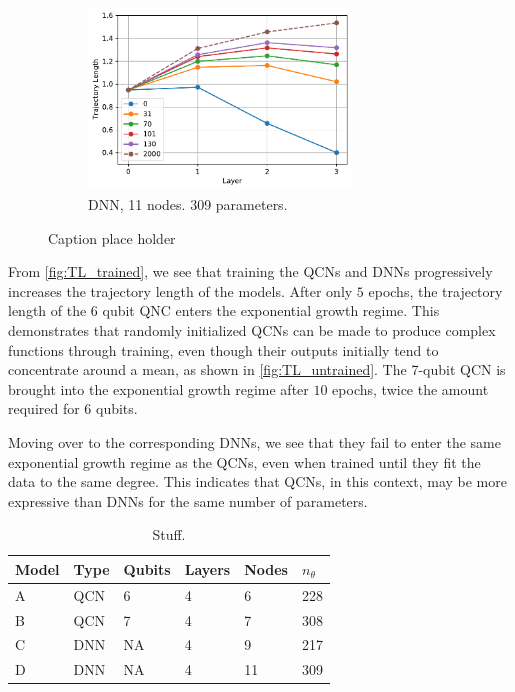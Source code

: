 \begin{figure}[H]
\begin{subfigure}[t]{0.5\textwidth}
    \end{subfigure}%
    \hfill 
    \begin{subfigure}[t]{0.5\textwidth}
        \centering
        \includegraphics[height=1.9in]{latex/figures/TL_trained_DNN_nodes_11}
        \caption{DNN, 11 nodes. 309 parameters.}
        \label{fig:TL_trained_D}
    \end{subfigure}
    \caption{Caption place holder}
    \label{fig:TL_trained}
\end{figure}

From \autoref{fig:TL_trained}, we see that training the QCNs and DNNs progressively increases the trajectory length of the models. After only $5$ epochs, the trajectory length of the 6 qubit QNC enters the exponential growth regime. This demonstrates that randomly initialized QCNs can be made to produce complex functions through training, even though their outputs initially tend to concentrate around a mean, as shown in \autoref{fig:TL_untrained}. The 7-qubit QCN is brought into the exponential growth regime after $10$ epochs, twice the amount required for 6 qubits. 

Moving over to the corresponding DNNs, we see that they fail to enter the same exponential growth regime as the QCNs, even when trained until they fit the data to the same degree. This indicates that QCNs, in this context, may be more expressive than DNNs for the same number of parameters.  

\begin{table}[H]
\centering
\begin{tabular}{|l|l|l|l|l|l|}
\hline
Model &Type & Qubits& Layers & Nodes &$n_{\theta}$ \\ \hline
A    & QCN & 6 &  4 & 6& 228   \\ \hline
B    & QCN & 7 &  4 & 7& 308 \\ \hline
C    & DNN & NA&  4 & 9& 217  \\ \hline
D    & DNN & NA&  4 & 11& 309  \\ \hline
\end{tabular}
\caption{Stuff.} 
\label{tab:TL models}
\end{table}


